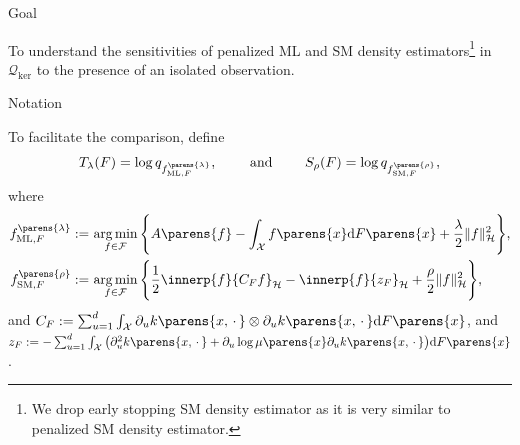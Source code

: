\documentclass[aspectratio=169,xcolor=dvipsnames]{beamer}
\DeclareMathOperator*{\argmin}{arg\,min}
\newcommand{\SM}{\mathrm{SM}}
\newcommand{\ML}{\mathrm{ML}}
\begin{document}
\begin{frame}{Goal}

	To understand the sensitivities of penalized ML and SM density estimators\footnote{We drop early stopping SM density estimator as it is very similar to penalized SM density estimator. } in $\mathcal{Q}_{\mathrm{ker}}$ to the presence of an isolated observation. %
	
\end{frame}



\begin{frame}{Notation}
	
	To facilitate the comparison, %
	define 
	\begin{align*}
		T_{\lambda} (F) = \log q_{f_{\ML, F}^{\parens{\lambda}}}, \qquad \text{ and } \qquad S_{\rho} (F) = \log q_{f_{\mathrm{SM}, F}^{\parens{\rho}}}, 
	\end{align*}
	where 
	\begin{align*}
		f_{\ML, F}^{\parens{\lambda}} := & \, \argmin_{f \in \mathcal{F}} \Bigg\{ A \parens{f} - \int_{\mathcal{X}} f \parens{x} \mathrm{d} F \parens{x} + \frac{\lambda}{2} \Vert f \Vert_{\mathcal{H}}^2 \Bigg\}, \\
		f_{\SM, F}^{\parens{\rho}} := & \, \argmin_{f \in \mathcal{F}} \Bigg\{ \frac{1}{2} \innerp{f}{C_F f}_{\mathcal{H}} - \innerp{f}{z_F}_{\mathcal{H}} + \frac{\rho}{2} \Vert f \Vert_{\mathcal{H}}^2 \Bigg\}, 
	\end{align*}
	and $C_F := \sum_{u=1}^d \int_{\mathcal{X}} \partial_u k \parens{x, \,\cdot\,} \otimes \partial_u k \parens{x, \,\cdot\,} \mathrm{d} F \parens{x}$, and $z_F := - \sum_{u=1}^d \int_{\mathcal{X}} \big( \partial_u^2 k \parens{x, \,\cdot\,} + \partial_u \log \mu \parens{x} \partial_u k \parens{x, \,\cdot\,} \big) \mathrm{d} F \parens{x}$. 

\end{frame}
\end{document}
